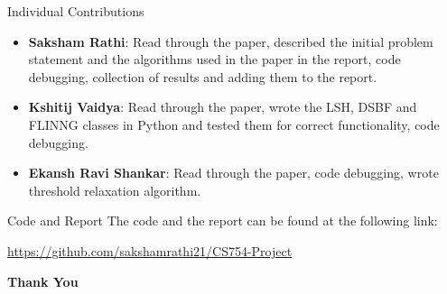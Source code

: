 \documentclass[Serif, 10pt, brown]{beamer}
\theoremstyle{example}
\theoremstyle{plain}
\begin{document}
\begin{frame}{Individual Contributions}
	\begin{itemize}
		\item \textbf{Saksham Rathi}: Read through the paper, described the initial problem statement and the algorithms used in the paper in the report, code debugging, collection of results and adding them to the report.
		\item \textbf{Kshitij Vaidya}: Read through the paper, wrote the LSH, DSBF and FLINNG classes in Python and tested them for correct functionality, code debugging.
		\item \textbf{Ekansh Ravi Shankar}: Read through the paper, code debugging, wrote threshold relaxation algorithm.
	\end{itemize}
	
\end{frame}


\begin{frame}{Code and Report}
    The code and the report can be found at the following link:
    \begin{center}
        \url{https://github.com/sakshamrathi21/CS754-Project}
    \end{center}
\end{frame}

\begin{frame}
    \Huge{\centerline{\bf Thank You}}
\end{frame}
\end{document}
